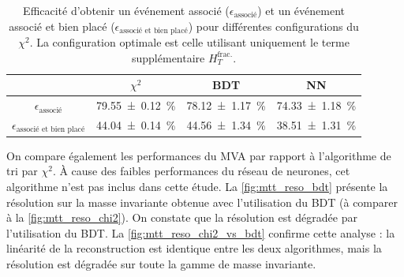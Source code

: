 \begin{table}[tbp] \centering
    \begin{tabular}{@{}cccc@{}} \toprule
        & $\chi^2$ & BDT & NN \\ \midrule
        $\epsilon_\text{associé}$ & \SI{79.55 \pm 0.12}{\%} & \SI{78.12 \pm 1.17}{\%} & \SI{74.33 \pm 1.18}{\%} \\
        $\epsilon_\text{associé et bien placé}$ & \SI{44.04 \pm 0.14}{\%} & \SI{44.56 \pm 1.34}{\%} & \SI{38.51 \pm 1.31}{\%} \\ \bottomrule
    \end{tabular}
    \caption{Efficacité d'obtenir un événement associé ($\epsilon_\text{associé}$) et un événement associé et bien placé ($\epsilon_\text{associé et bien placé}$) pour différentes configurations du $\chi^2$. La configuration optimale est celle utilisant uniquement le terme supplémentaire $H_{T}^{\text{frac.}}$.}
    \label{tab:chi2_vs_bdt_vs_nn}
\end{table}


\smallskip

On compare également les performances du MVA par rapport à l'algorithme de tri par $\chi^2$. À cause des faibles performances du réseau de neurones, cet algorithme n'est pas inclus dans cette étude. La \cref{fig:mtt_reso_bdt} présente la résolution sur la masse invariante obtenue avec l'utilisation du BDT (à comparer à la \cref{fig:mtt_reso_chi2}). On constate que la résolution est dégradée par l'utilisation du BDT. La \cref{fig:mtt_reso_chi2_vs_bdt} confirme cette analyse : la linéarité de la reconstruction est identique entre les deux algorithmes, mais la résolution est dégradée sur toute la gamme de masse invariante.

